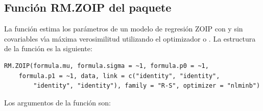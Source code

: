 \subsection*{Funci\'{o}n RM.ZOIP del paquete }

La funci\'{o}n  estima los par\'{a}metros de un modelo de regresi\'{o}n ZOIP con y sin covariables v\'{\i}a m\'{a}xima verosimilitud utilizando el optimizador  o . La estructura de la funci\'{o}n  es la siguiente:

\begin{verbatim}
RM.ZOIP(formula.mu, formula.sigma = ~1, formula.p0 = ~1, 
    formula.p1 = ~1, data, link = c("identity", "identity", 
        "identity", "identity"), family = "R-S", optimizer = "nlminb")
\end{verbatim}

Los argumentos de la funci\'{o}n  son:

